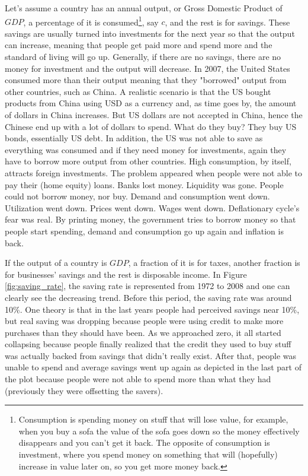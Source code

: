 Let's assume a country has an annual output, or Gross Domestic Product of $GDP$, a percentage of it is consumed\footnote{Consumption is spending money on stuff that will lose value, for example, when you buy a sofa the value of the sofa goes down so the money effectively disappears and you can't get it back. The opposite of consumption is investment, where you spend money on something that will (hopefully) increase in value later on, so you get more money back.}, say $c$, and the rest is for savings. These savings are usually turned into investments for the next year so that the output can increase, meaning that people get paid more and spend more and the standard of living will go up. Generally, if there are no savings, there are no money for investment and the output will decrease. In 2007, the United States consumed more than their output meaning that they "borrowed" output from other countries, such as China. A realistic scenario is that the US bought products from China using USD as a currency and, as time goes by, the amount of dollars in China increases. But US dollars are not accepted in China, hence the Chinese end up with a lot of dollars to spend. What do they buy? They buy US bonds, essentially US debt. In addition, the US was not able to save as everything was consumed and if they need money for investments, again they have to borrow more output from other countries. High consumption, by itself, attracts foreign investments. The problem appeared when people were not able to pay their (home equity) loans. Banks lost money. Liquidity was gone. People could not borrow money, nor buy. Demand and consumption went down. Utilization went down. Prices went down. Wages went down. Deflationary cycle's fear was real. By printing money, the government tries to borrow money so that people start spending, demand and consumption go up again and inflation is back. 

If the output of a country is $GDP$, a fraction of it is for taxes, another fraction is for businesses' savings and the rest is disposable income. In Figure \ref{fig:saving_rate}, the saving rate is represented from 1972 to 2008 and one can clearly see the decreasing trend. Before this period, the saving rate was around 10\%. One theory is that in the last years people had perceived savings near 10\%, but real saving was dropping because people were using credit to make more purchases than they should have been. As we approached zero, it all started collapsing because people finally realized that the credit they used to buy stuff was actually backed from savings that didn't really exist. After that, people was unable to spend and average savings went up again as depicted in the last part of the plot because people were not able to spend more than what they had (previously they were offsetting the savers).

